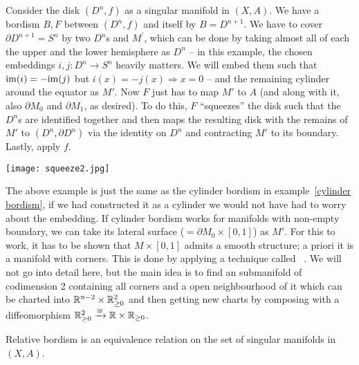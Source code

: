 \documentclass[a4paper,11pt]{article}
\begin{document}
\begin{example}\label{pokeball}
    Consider the disk \((D^n,f)\) as a singular manifold in \((X,A)\). 
    We have a bordism \(B,F\) between \((D^n,f)\) and itself by \(B=D^{n+1}\). We have to cover \(\partial D^{n+1}=S^n\) by two \(D^n\)s and \(M^\prime\), which can be done by taking almost all of each the upper and the lower hemisphere as \(D^n\) --  
    in this example, the chosen embeddings \(i,j:D^n\to S^n\) heavily matters. We will embed them such that \(\mathrm{im}(i)=-\mathrm{im}(j)\) but \(i(x)=-j(x)\Rightarrow x=0\) --
    and the remaining cylinder around the equator as \(M'\). 
    Now \(F\) just has to map \(M'\) to \(A\) (and along with it, also \(\partial M_0\) and \(\partial M_1\), as desired). 
    To do this, \(F\) \enquote{squeezes} the disk such that the \(D^n\)s are identified together and then maps the resulting disk with the remains of \(M'\) to \((D^n,\partial D^n)\) via the identity on \(D^n\) and contracting \(M'\) to its boundary. Lastly, apply \(f\).
    \begin{center}
        \texttt{[image: squeeze2.jpg]}
    \end{center}
\end{example}

\begin{remark}
    The above example is just the same as the cylinder bordism in example\ \ref{cylinder bordism}, if we had constructed it as a cylinder we would not have had to worry about the embedding. If cylinder bordism works for manifolds with non-empty boundary, we can take its lateral surface (\(=\partial M_0\times [0,1]\)) as \(M'\). For this to work, it has to be shown that \(M\times[0,1]\) admits a smooth structure; a priori it is a manifold with corners. This is done by applying a technique called \ \cite[\nopp I.3]{conner}. We will not go into detail here, but the main idea is to find an submanifold of codimension 2 containing all corners and a open neighbourhood of it which can be charted into \(\mathbb{R}^{n-2}\times\mathbb{R}_{\geq0}^2\) and then getting new charts by composing with a diffeomorphism \(\mathbb{R}_{\geq0}^2\xrightarrow\cong\mathbb{R}\times\mathbb{R}_{\geq0}\).
\end{remark}

\begin{theorem}
    Relative bordism is an equivalence relation on the set of singular manifolds in \((X,A)\).
\end{theorem}
\end{document}
